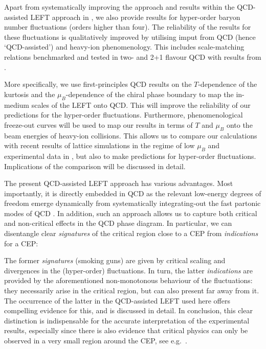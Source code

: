 \documentclass[%
reprint,
superscriptaddress,
showpacs,preprintnumbers,
amsmath,amssymb,
aps,
prd,
]{revtex4-1}
\begin{document}
Apart from systematically improving the approach and results within the QCD-assisted LEFT approach in  \cite{Fu:2015naa, Fu:2015amv, Fu:2016tey}, we also provide results for  hyper-order baryon number fluctuations (orders higher than four). The reliability of the results for these fluctuations is qualitatively improved by utilising imput from QCD (hence  `QCD-assisted') and heavy-ion phenomenology. This includes scale-matching relations benchmarked and tested in two- and 2+1 flavour QCD with results from \cite{Fu:2019hdw} . 

More specifically, we use first-principles QCD results on the $T$-dependence of the kurtosis and the $\mu_B$-dependence of the chiral phase boundary to map the in-medium scales of the LEFT onto QCD. This will improve the reliability of our predictions for the hyper-order fluctuations. Furthermore, phenomenological freeze-out curves will be used to map our results in terms of $T$ and $\mu_B$ onto the beam energies of heavy-ion collisions. This allows us to compare our calculations with recent results of lattice simulations in the regime of low $\mu_B$ and experimental data in \cite{Adam:2020unf, Nonaka:2020crv, Pandav:2020uzx}, but also to make predictions for hyper-order fluctuations. Implications of the comparison will be discussed in detail.
	
The present QCD-assisted LEFT approach has various advantages. Most importantly, it is directly embedded in QCD as the relevant low-energy degrees of freedom emerge dynamically from systematically integrating-out the fast partonic modes of QCD \cite{Mitter:2014wpa, Braun:2014ata, Rennecke:2015eba, Cyrol:2017ewj, Fu:2019hdw}. In addition, such an approach allows us to capture both critical and non-critical effects in the QCD phase diagram. In particular, we can disentangle clear \textit{signatures} of the critical region close to a CEP from \textit{indications} for a CEP: 
	
The former \textit{signatures} (smoking guns) are given by critical scaling and divergences in the (hyper-order) fluctuations. In turn, the latter \textit{indications} are provided by the aforementioned non-monotonous behaviour of the fluctuations: they necessarily arise in the critical region, but can also present far away from it. The occurrence of the latter in the QCD-assisted LEFT used here offers compelling evidence for this, and is discussed in detail. In conclusion, this clear distinction is indispensable for the accurate interpretation of the experimental results, especially since there is also evidence that critical physics can only be observed in a very small region around the CEP, see e.g.\ \cite{Schaefer:2006ds}. 
	
\end{document}
